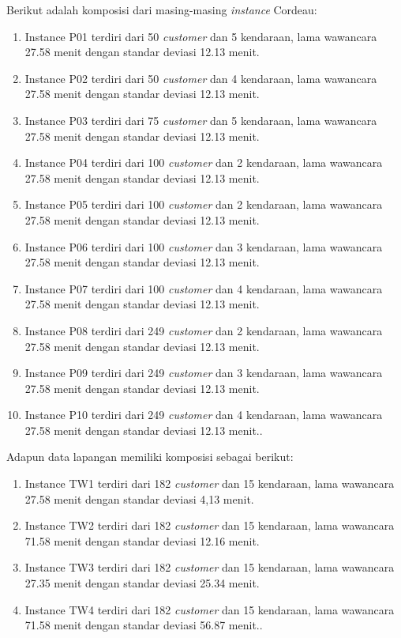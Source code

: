 Berikut adalah komposisi dari masing-masing \textit{instance} Cordeau:
\begin{enumerate}
	\item Instance P01 terdiri dari 50 \textit{customer} dan 5 kendaraan, lama wawancara 27.58 menit dengan standar deviasi 12.13 menit.
	\item Instance P02 terdiri dari 50 \textit{customer} dan 4 kendaraan, lama wawancara 27.58 menit dengan standar deviasi 12.13 menit.
	\item Instance P03 terdiri dari 75 \textit{customer} dan 5 kendaraan, lama wawancara 27.58 menit dengan standar deviasi 12.13 menit.
	\item Instance P04 terdiri dari 100 \textit{customer} dan 2 kendaraan, lama wawancara 27.58 menit dengan standar deviasi 12.13 menit.
	\item Instance P05 terdiri dari 100 \textit{customer} dan 2 kendaraan, lama wawancara 27.58 menit dengan standar deviasi 12.13 menit.
	\item Instance P06 terdiri dari 100 \textit{customer} dan 3 kendaraan, lama wawancara 27.58 menit dengan standar deviasi 12.13 menit.
	\item Instance P07 terdiri dari 100 \textit{customer} dan 4 kendaraan, lama wawancara 27.58 menit dengan standar deviasi 12.13 menit.
	\item Instance P08 terdiri dari 249 \textit{customer} dan 2 kendaraan, lama wawancara 27.58 menit dengan standar deviasi 12.13 menit.
	\item Instance P09 terdiri dari 249 \textit{customer} dan 3 kendaraan, lama wawancara 27.58 menit dengan standar deviasi 12.13 menit.
	\item Instance P10 terdiri dari 249 \textit{customer} dan 4 kendaraan, lama wawancara 27.58 menit dengan standar deviasi 12.13 menit..
\end{enumerate}
Adapun data lapangan memiliki komposisi sebagai berikut:
\begin{enumerate}
	\item Instance TW1 terdiri dari 182 \textit{customer} dan 15 kendaraan, lama wawancara 27.58 menit dengan standar deviasi 4,13 menit.
	\item Instance TW2 terdiri dari 182 \textit{customer} dan 15 kendaraan, lama wawancara 71.58 menit dengan standar deviasi 12.16 menit.
	\item Instance TW3 terdiri dari 182 \textit{customer} dan 15 kendaraan, lama wawancara 27.35 menit dengan standar deviasi 25.34 menit.
	\item Instance TW4 terdiri dari 182 \textit{customer} dan 15 kendaraan, lama wawancara 71.58 menit dengan standar deviasi 56.87 menit..
\end{enumerate}


